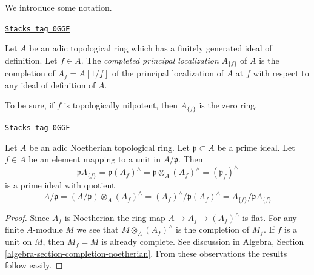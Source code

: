 We introduce some notation.

\begin{definition}
\label{restricted-definition-completed-principal-localization}
\href{https://stacks.math.columbia.edu/tag/0GGE}{\texttt{Stacks tag 0GGE}}

Let $A$ be an adic topological ring which has a finitely generated ideal
of definition. Let $f \in A$. The {\it completed principal localization}
$A_{\{f\}}$ of $A$ is the completion of $A_f = A[1/f]$
of the principal localization of $A$ at $f$ with respect to any
ideal of definition of $A$.
\end{definition}

To be sure, if $f$ is topologically nilpotent, then $A_{\{f\}}$
is the zero ring.

\begin{lemma}
\label{restricted-lemma-rig-closed-point-in-localization}
\href{https://stacks.math.columbia.edu/tag/0GGF}{\texttt{Stacks tag 0GGF}}

Let $A$ be an adic Noetherian topological ring.
Let $\mathfrak p \subset A$ be a prime ideal.
Let $f \in A$ be an element mapping to a unit in $A/\mathfrak p$.
Then
$$
\mathfrak p A_{\{f\}} =
\mathfrak p(A_f)^\wedge =
\mathfrak p \otimes_A (A_f)^\wedge =
(\mathfrak p_f)^\wedge
$$
is a prime ideal with quotient
$$
A/\mathfrak p = (A/\mathfrak p) \otimes_A (A_f)^\wedge =
(A_f)^\wedge / \mathfrak p (A_f)^\wedge = A_{\{f\}}/\mathfrak p A_{\{f\}}
$$
\end{lemma}

\begin{proof}
Since $A_f$ is Noetherian the ring map $A \to A_f \to (A_f)^\wedge$
is flat. For any finite $A$-module $M$ we see that
$M \otimes_A (A_f)^\wedge$ is the completion of $M_f$.
If $f$ is a unit on $M$, then $M_f = M$ is already complete.
See discussion in Algebra, Section \ref{algebra-section-completion-noetherian}.
From these observations the results follow easily.
\end{proof}

